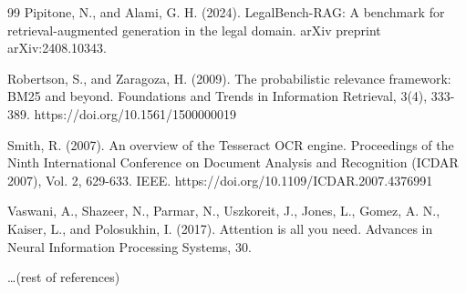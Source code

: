 \documentclass[a4paper,fleqn]{cas-dc}
\begin{document}
\begin{thebibliography}{99}
 Pipitone, N., and Alami, G. H. (2024). LegalBench-RAG: A benchmark for retrieval-augmented generation in the legal domain. arXiv preprint arXiv:2408.10343.

 Robertson, S., and Zaragoza, H. (2009). The probabilistic relevance framework: BM25 and beyond. Foundations and Trends in Information Retrieval, 3(4), 333-389. https://doi.org/10.1561/1500000019

 Smith, R. (2007). An overview of the Tesseract OCR engine. Proceedings of the Ninth International Conference on Document Analysis and Recognition (ICDAR 2007), Vol. 2, 629-633. IEEE. https://doi.org/10.1109/ICDAR.2007.4376991

 Vaswani, A., Shazeer, N., Parmar, N., Uszkoreit, J., Jones, L., Gomez, A. N., Kaiser, L., and Polosukhin, I. (2017). Attention is all you need. Advances in Neural Information Processing Systems, 30.

\dots (rest of references)
\end{thebibliography}
\end{document}
